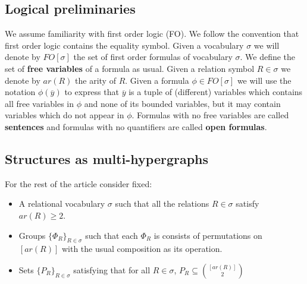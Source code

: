 \documentclass[12pt,notitlepage,a4paper]{article}
\theoremstyle{definition}
\begin{document}
\subsection{Logical preliminaries}
We assume familiarity with first order logic (FO). We follow 
the convention that first order logic contains the equality symbol. 
Given a vocabulary $\sigma$ we will denote by $FO[\sigma]$ the set of 
first order formulas of vocabulary $\sigma$. We define the set of 
\textbf{free variables} of a formula as usual. 
Given a relation symbol $R\in \sigma$ we denote by $ar(R)$ the arity of $R$. 
Given a formula $\phi\in FO[\sigma]$ we will use the notation $\phi(\overline{y})$ 
to express that $\overline{y}$ is a tuple of 
(different) variables which contains all free variables in $\phi$ and
none of its bounded variables, but it may contain variables
which do not appear in $\phi$.
Formulas with no free variables are called \textbf{sentences} and 
formulas with no quantifiers are called \textbf{open formulas}. 


\subsection{Structures as multi-hypergraphs} \label{sect:structures}

For the rest of the article consider fixed:
\begin{itemize}
	\item A relational vocabulary $\sigma$ such 
	that all the relations $R\in\sigma$ satisfy $ar(R)\geq 2$. 
	\item 
	Groups $\{ \Phi_R \}_{R\in \sigma}$
	such that each $\Phi_R$ is consists of 
	permutations on $[ar(R)]$ with the usual 
	composition as its operation.	
	\item 
	Sets $\{P_R\}_{R\in \sigma}$ satisfying that for 
	all $R\in \sigma$, 
	$P_R\subseteq \binom{[ar(R)]}{2}$
	
	
\end{itemize}
%

\end{document}
